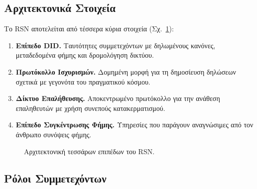 \documentclass[11pt,a4paper,twocolumn]{article}
\begin{document}
\subsection{Αρχιτεκτονικά Στοιχεία}

Το RSN αποτελείται από τέσσερα κύρια στοιχεία (Σχ.~\ref{fig:architecture}):
\begin{enumerate}[nosep]
\item \textbf{Επίπεδο DID.} Ταυτότητες συμμετεχόντων με δηλωμένους κανόνες, μεταδεδομένα φήμης και δρομολόγηση δικτύου.
\item \textbf{Πρωτόκολλο Ισχυρισμών.} Δομημένη μορφή για τη δημοσίευση δηλώσεων σχετικά με γεγονότα του πραγματικού κόσμου.
\item \textbf{Δίκτυο Επαλήθευσης.} Αποκεντρωμένο πρωτόκολλο για την ανάθεση επαληθευτών με χρήση συνεπούς κατακερματισμού.
\item \textbf{Επίπεδο Συγκέντρωσης Φήμης.} Υπηρεσίες που παράγουν αναγνώσιμες από τον άνθρωπο συνόψεις φήμης.
\end{enumerate}

\begin{figure}[ht]
\centering
{}
\caption{Αρχιτεκτονική τεσσάρων επιπέδων του RSN.}
\label{fig:architecture}
\end{figure}

\subsection{Ρόλοι Συμμετεχόντων}
\end{document}
